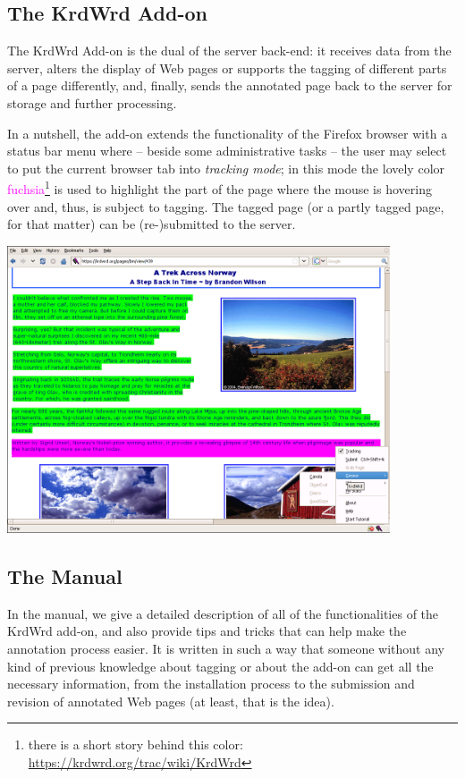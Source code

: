 \documentclass[12pt]{article}
\begin{document}
\subsection{The KrdWrd Add-on\footnotemark}

The KrdWrd Add-on is the dual of the server back-end: it receives data from the server, alters the display of Web pages or supports the tagging of different parts of a page differently, and, finally, sends the annotated page back to the server for storage and further processing.

In a nutshell, the add-on extends the functionality of the Firefox browser with a status bar menu where -- beside some administrative tasks -- the user may select to put the current browser tab into \textit{tracking mode}; in this mode the lovely color \textcolor{fuchsia}{fuchsia}\footnote{there is a short story behind this color: \url{https://krdwrd.org/trac/wiki/KrdWrd}}  is used to highlight the part of the page where the mouse is hovering over and, thus, is subject to tagging.  The tagged page (or a partly tagged page, for that matter) can be (re-)submitted to the server.

\begin{center}
\includegraphics[width=0.85\textwidth]{images/taggingaction.png}  
\end{center}

\addtocounter{footnote}{1}
\subsection{The Manual\footnotemark[\value{footnote}]}

In the manual, we give a detailed description of all of the functionalities of the KrdWrd add-on, and also provide tips and tricks that can help make the annotation process easier. It is written in such a way that someone without any kind of previous knowledge about tagging or about the add-on can get all the necessary information, from the installation process to the submission and revision of annotated Web pages (at least, that is the idea).
\end{document}
